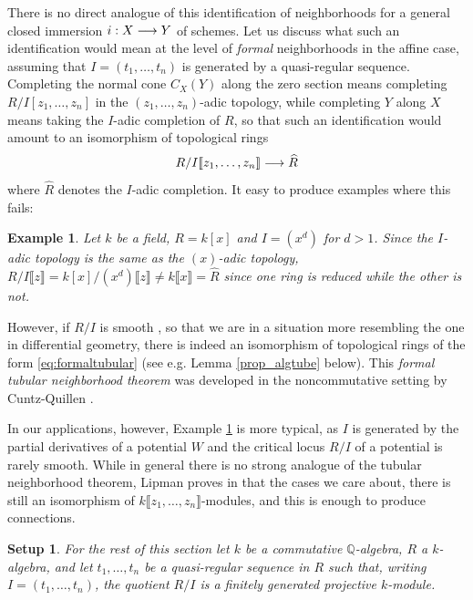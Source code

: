 \documentclass[english,letter paper,12pt,leqno]{article}
\newtheorem{setup}[theorem]{Setup}
\theoremstyle{example}
\newtheorem{example}[theorem]{Example}
\numberwithin{equation}{section}
\def\be{\begin{equation}}
\def\ee{\end{equation}}
\begin{document}
There is no direct analogue of this identification of neighborhoods for a general closed immersion $i: X \longrightarrow Y$ of schemes. Let us discuss what such an identification would mean at the level of \emph{formal} neighborhoods in the affine case, assuming that $I = (t_1,\ldots,t_n)$ is generated by a quasi-regular sequence. Completing the normal cone $C_X(Y)$ along the zero section means completing $R/I[z_1,\ldots,z_n]$ in the $(z_1,\ldots,z_n)$-adic topology, while completing $Y$ along $X$ means taking the $I$-adic completion of $R$, so that such an identification would amount to an isomorphism of topological rings
\be\label{eq:formaltubular}
R/I\llbracket z_1,\ldots,z_n \rrbracket \lto \widehat{R}
\ee
where $\widehat{R}$ denotes the $I$-adic completion. It easy to produce examples where this fails:

\begin{example}\label{eq:example_nontub} Let $k$ be a field, $R = k[x]$ and $I = (x^d)$ for $d > 1$. Since the $I$-adic topology is the same as the $(x)$-adic topology, $R/I\llbracket z \rrbracket = k[x]/(x^d) \llbracket z \rrbracket \neq k\llbracket x \rrbracket = \widehat{R}$ since one ring is reduced while the other is not.
\end{example}

However, if $R/I$ is smooth \cite[Definition 28.D]{matsumura}, so that we are in a situation more resembling the one in differential geometry, there is indeed an isomorphism of topological rings of the form \eqref{eq:formaltubular} (see e.g. Lemma \ref{prop_algtube} below). This \emph{formal tubular neighborhood theorem} was developed in the noncommutative setting by Cuntz-Quillen \cite[Theorem 2]{cuntzquillen}. 

In our applications, however, Example \ref{eq:example_nontub} is more typical, as $I$ is generated by the partial derivatives of a potential $W$ and the critical locus $R/I$ of a potential is rarely smooth. While in general there is no strong analogue of the tubular neighborhood theorem, Lipman proves in \cite{lipman} that the cases we care about, there is still an isomorphism of $k\llbracket z_1,\ldots,z_n \rrbracket$-modules, and this is enough to produce connections.

\begin{setup}\label{setup:connection_t} For the rest of this section let $k$ be a commutative $\mathbb{Q}$-algebra, $R$ a $k$-algebra, and let $t_1,\ldots,t_n$ be a quasi-regular sequence in $R$ such that, writing $I = (t_1,\ldots,t_n)$, the quotient $R/I$ is a finitely generated projective $k$-module.
\end{setup}
\end{document}
